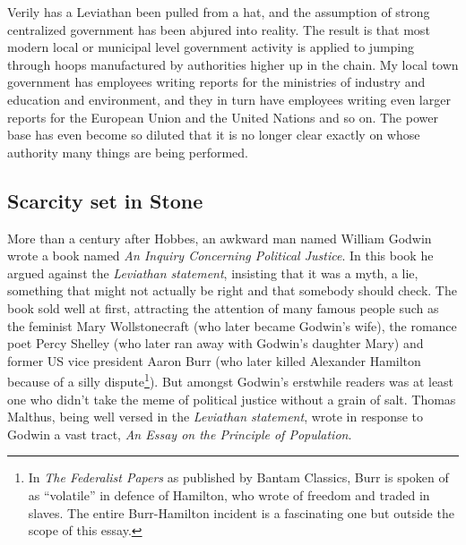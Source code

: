 Verily has a Leviathan been pulled from a hat, and the assumption of strong
centralized government has been abjured into reality. The result is that most
modern local or municipal level government activity is applied to jumping
through hoops manufactured by authorities higher up in the chain. My local town
government has employees writing reports for the ministries of industry and
education and environment, and they in turn have employees writing even larger
reports for the European Union and the United Nations and so on. The power base
has even become so diluted that it is no longer clear exactly on whose 
authority many things are being performed.


\subsection{Scarcity set in Stone}
\label{s:artificial_scarcity:unspoken_mythology:scarcity_in_stone}

More than a century after Hobbes, an awkward man named William Godwin wrote a
book named \textit{An Inquiry Concerning Political Justice}. In this book he
argued against the \textit{Leviathan statement}, insisting that it was a myth, 
a lie, something that might not actually be right and that somebody should
check.  The book sold well at f\hbox{}irst, attracting the attention of many
famous people such as the feminist Mary Wollstonecraft (who later became
Godwin's wife), the romance poet Percy Shelley (who later ran away with 
Godwin's daughter Mary) and former US vice president Aaron Burr (who later
killed Alexander Hamilton because of a silly dispute\footnote{In \textit{The
Federalist Papers} as published by Bantam Classics, Burr is spoken of as
``volatile'' in defence of Hamilton, who wrote of freedom and traded in slaves.
The entire Burr-Hamilton incident is a fascinating one but outside the scope of
this essay.}). But amongst Godwin's erstwhile readers was at least one who
didn't take the meme of political justice without a grain of salt. Thomas
Malthus, being well versed in the \textit{Leviathan statement}, wrote in
response to Godwin a vast tract, \textit{An Essay on the Principle of
Population}.

